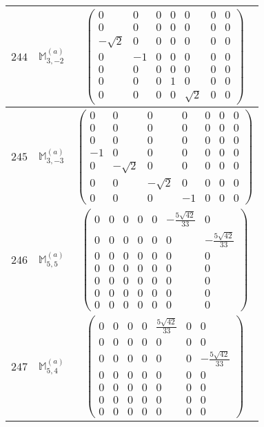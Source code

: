 \documentclass[fleqn,8pt,landscape]{jsarticle}
\begin{document}
\begin{center}
\begin{longtable}{ccc}
$ 244 $ & $ \mathbb{M}_{3,-2}^{(a)} $ & $ \begin{pmatrix} 0 & 0 & 0 & 0 & 0 & 0 & 0 \\ 0 & 0 & 0 & 0 & 0 & 0 & 0 \\ - \sqrt{2} & 0 & 0 & 0 & 0 & 0 & 0 \\ 0 & -1 & 0 & 0 & 0 & 0 & 0 \\ 0 & 0 & 0 & 0 & 0 & 0 & 0 \\ 0 & 0 & 0 & 1 & 0 & 0 & 0 \\ 0 & 0 & 0 & 0 & \sqrt{2} & 0 & 0 \end{pmatrix} $ \\ \hline
$ 245 $ & $ \mathbb{M}_{3,-3}^{(a)} $ & $ \begin{pmatrix} 0 & 0 & 0 & 0 & 0 & 0 & 0 \\ 0 & 0 & 0 & 0 & 0 & 0 & 0 \\ 0 & 0 & 0 & 0 & 0 & 0 & 0 \\ -1 & 0 & 0 & 0 & 0 & 0 & 0 \\ 0 & - \sqrt{2} & 0 & 0 & 0 & 0 & 0 \\ 0 & 0 & - \sqrt{2} & 0 & 0 & 0 & 0 \\ 0 & 0 & 0 & -1 & 0 & 0 & 0 \end{pmatrix} $ \\ \hline
$ 246 $ & $ \mathbb{M}_{5,5}^{(a)} $ & $ \begin{pmatrix} 0 & 0 & 0 & 0 & 0 & - \frac{5 \sqrt{42}}{33} & 0 \\ 0 & 0 & 0 & 0 & 0 & 0 & - \frac{5 \sqrt{42}}{33} \\ 0 & 0 & 0 & 0 & 0 & 0 & 0 \\ 0 & 0 & 0 & 0 & 0 & 0 & 0 \\ 0 & 0 & 0 & 0 & 0 & 0 & 0 \\ 0 & 0 & 0 & 0 & 0 & 0 & 0 \\ 0 & 0 & 0 & 0 & 0 & 0 & 0 \end{pmatrix} $ \\ \hline
$ 247 $ & $ \mathbb{M}_{5,4}^{(a)} $ & $ \begin{pmatrix} 0 & 0 & 0 & 0 & \frac{5 \sqrt{42}}{33} & 0 & 0 \\ 0 & 0 & 0 & 0 & 0 & 0 & 0 \\ 0 & 0 & 0 & 0 & 0 & 0 & - \frac{5 \sqrt{42}}{33} \\ 0 & 0 & 0 & 0 & 0 & 0 & 0 \\ 0 & 0 & 0 & 0 & 0 & 0 & 0 \\ 0 & 0 & 0 & 0 & 0 & 0 & 0 \\ 0 & 0 & 0 & 0 & 0 & 0 & 0 \end{pmatrix} $ \\ \hline

\end{longtable}
\end{center}
\end{document}
